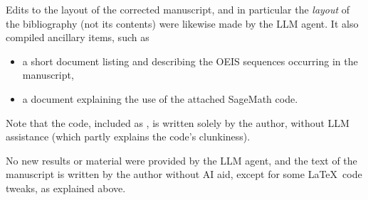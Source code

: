 \documentclass[12pt]{article}
\theoremstyle{definition}
\theoremstyle{remark}
\theoremstyle{plain}
\begin{document}
Edits to the layout of the corrected manuscript, and in particular the \emph{layout} of the bibliography (not its contents)
were likewise made by the LLM agent.
It also compiled ancillary items, such as
\begin{itemize}
  \item  a short document listing and describing the  OEIS sequences occurring in the manuscript,
\item   a document explaining the use of the attached SageMath code.      
\end{itemize}
Note that the code, included as ,
is written solely by the author, without LLM assistance (which partly explains the code's clunkiness).

No new results or material were provided by the LLM agent, and the text of the manuscript is written by the author without AI aid, except for some \LaTeX\ code tweaks, as explained above.



\end{document}
